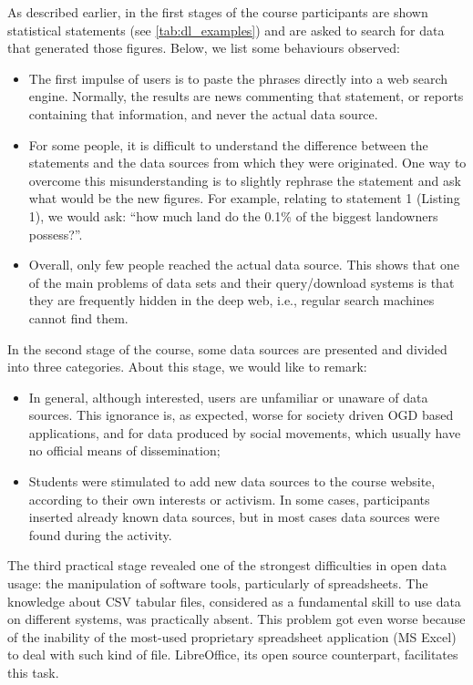 As described earlier, in the first stages of the course participants are shown statistical statements (see \autoref{tab:dl_examples}) and are asked to search for data that generated those figures. Below, we list some behaviours observed:

\begin{itemize}
\item The first impulse of users is to paste the phrases directly into a web search engine. Normally, the results are news commenting that statement, or reports containing that information, and never the actual data source.
\item For some people, it is difficult to understand the difference between the statements and the data sources from which they were originated. One way to overcome this misunderstanding is to slightly rephrase the statement and ask what would be the new figures. For example, relating to statement 1 (Listing 1), we would ask: “how much land do the 0.1\% of the biggest landowners possess?”.
\item Overall, only few people reached the actual data source. This shows that one of the main problems of data sets and their query/download systems is that they are frequently hidden in the deep web, i.e., regular search machines cannot find them.
\end{itemize}

In the second stage of the course, some data sources are presented and divided into three categories. About this stage, we would like to remark:

\begin{itemize}
\item In general, although interested, users are unfamiliar or unaware of data sources. This ignorance is, as expected, worse for society driven OGD based applications, and for data produced by social movements, which usually have no official means of dissemination;
\item Students were stimulated to add new data sources to the course website, according to their own interests or activism. In some cases, participants inserted already known data sources, but in most cases data sources were found during the activity.
\end{itemize}

The third practical stage revealed one of the strongest difficulties in open data usage: the manipulation of software tools, particularly of spreadsheets. The knowledge about CSV tabular files, considered as a fundamental skill to use data on different systems, was practically absent. This problem got even worse because of the inability of the most-used proprietary spreadsheet application (MS Excel) to deal with such kind of file. LibreOffice, its open source counterpart, facilitates this task.

